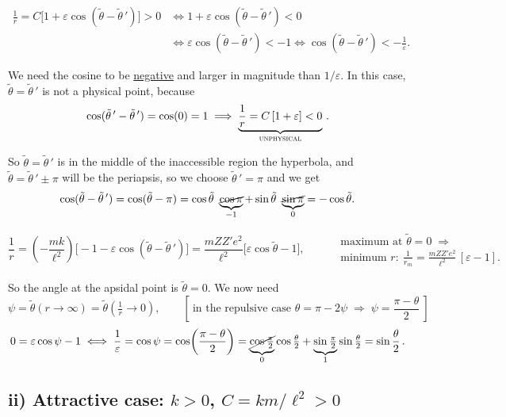 \documentclass[11pt]{article}
\newcommand{\half}[1]{\tfrac{#1}{2}}
\begin{document}
\begin{align*}
\frac{1}{r} = C\bigl[1 + \varepsilon\cos(\tilde\theta-\tilde\theta\,')\bigr] > 0
&\iff 1 + \varepsilon\cos(\tilde\theta-\tilde\theta\,') < 0\\
&\iff \varepsilon\cos(\tilde\theta-\tilde\theta\,') < -1
 \iff \cos(\tilde\theta-\tilde\theta\,') < -\frac{1}{\varepsilon}.
\end{align*}

We need the cosine to be \underline{negative} and larger in magnitude than
$1/\varepsilon$. In this case, $\tilde\theta = \tilde\theta\,'$ is not a physical
point, because
\[
\cos(\tilde\theta\,'-\tilde\theta\,') = \cos(0) = 1
\;\Longrightarrow\;
\underbrace{\frac{1}{r} = C\,[1+\varepsilon] < 0}_{\textsc{unphysical}}\,.
\]

So $\tilde\theta = \tilde\theta\,'$ is in the middle of the inaccessible region
 the hyperbola, and $\tilde\theta = \tilde\theta\,' \pm \pi$ will be
the periapsis, so we choose $\tilde\theta\,' = \pi$ and we get
\[
\cos(\tilde\theta - \tilde\theta\,') = \cos(\tilde\theta - \pi)
 = \cos\tilde\theta\ \underbrace{\cancel{\cos\pi}}_{-1}
 + \sin\tilde\theta\ \underbrace{\cancel{\sin\pi}}_{0}
 = -\cos\tilde\theta .
\]

\[
\frac{1}{r} = \left(-\frac{mk}{\ell^{2}}\right)
   \bigl[-1 - \varepsilon\cos(\tilde\theta-\tilde\theta\,')\bigr]
 = \frac{m Z Z' e^{2}}{\ell^{2}}\bigl[\varepsilon\cos\tilde\theta - 1\bigr],
\qquad
\begin{aligned}
&\text{maximum at } \tilde\theta = 0 \;\Rightarrow\\
&\text{minimum } r:\ \frac{1}{r_{m}} = \frac{m Z Z' e^{2}}{\ell^{2}}\,[\varepsilon-1].
\end{aligned}
\]

So the angle at the apsidal point is $\tilde\theta = 0$. We now need
\[
\psi = \tilde\theta(r\to\infty) = \tilde\theta\!\left(\tfrac{1}{r}\to 0\right),
\qquad
\left[\ \text{in the repulsive case } \theta = \pi - 2\psi
 \;\Rightarrow\; \psi = \frac{\pi-\theta}{2}\ \right]
\]
\[
0 = \varepsilon\cos\psi - 1
\iff \frac{1}{\varepsilon} = \cos\psi = \cos\!\left(\frac{\pi-\theta}{2}\right)
 = \underbrace{\cancel{\cos\half{\pi}}}_{0}\cos\half{\theta}
 + \underbrace{\sin\half{\pi}}_{1}\sin\half{\theta}
 = \sin\frac{\theta}{2}\,.
\]

\subsection*{ii) Attractive case: \texorpdfstring{$k>0$}{k>0}, \texorpdfstring{$C = km/\ell^2 > 0$}{C = km/l2 > 0}}
\end{document}
